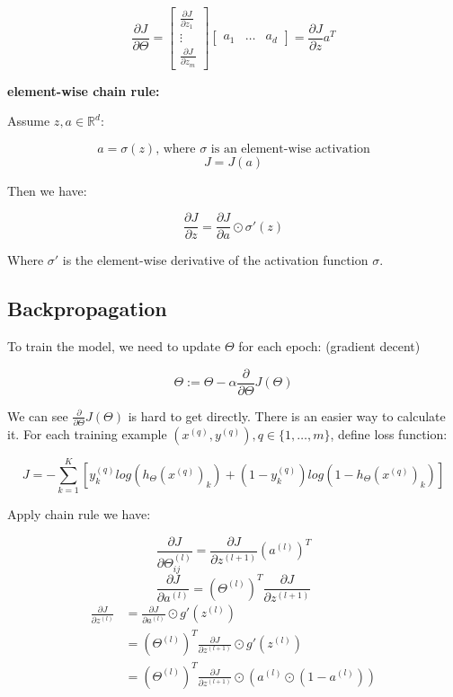 \documentclass{article}
\begin{document}
\[
\frac{\partial J}{\partial \Theta} = 
\begin{bmatrix}
\frac{\partial J}{\partial z_1}\\
\vdots\\
\frac{\partial J}{\partial z_m}
\end{bmatrix}
\begin{bmatrix}
a_1 & \dots & a_d
\end{bmatrix}
= \frac{\partial J}{\partial z} a^T
\]

\noindent \textbf{element-wise chain rule:}

\noindent Assume \(z, a \in \mathbb{R}^d\):

\[a = \sigma(z) \text{, where \(\sigma\) is an element-wise activation}\]
\[J = J(a)\]

\noindent Then we have:

\[\frac{\partial J}{\partial z} = \frac{\partial J}{\partial a} \odot \sigma'(z)\]

\noindent Where \(\sigma'\) is the element-wise derivative of the activation function \(\sigma\).

\subsection{Backpropagation}

\noindent To train the model, we need to update \(\Theta\) for each epoch: (gradient decent)

\[\Theta := \Theta - \alpha  \frac{\partial}{\partial \Theta} J(\Theta)\]

\noindent We can see \(\frac{\partial}{\partial \Theta} J(\Theta)\) is hard to get directly. There is an easier way to calculate it. For each training example \((x^{(q)}, y^{(q)}), q \in \{1, \dots, m\}\), define loss function:

\[J = -\sum_{k = 1}^{K} [y^{(q)}_k log(h_{\Theta} (x^{(q)})_k) + (1 - y^{(q)}_k) log(1 - h_{\Theta}(x^{(q)})_k)] \]

\noindent Apply chain rule we have:

\[\frac{\partial J}{\partial \Theta_{ij}^{(l)}} = \frac{\partial J}{\partial z^{(l + 1)}} (a^{(l)})^T\]
\[\frac{\partial J}{\partial a^{(l)}} = (\Theta^{(l)})^T \frac{\partial J}{\partial z^{(l + 1)}}\]
\begin{equation*}
\begin{split}
\frac{\partial J}{\partial z^{(l)}}
& = \frac{\partial J}{\partial a^{(l)}} \odot g'(z^{(l)}) \\
& = (\Theta^{(l)})^T \frac{\partial J}{\partial z^{(l + 1)}} \odot g'(z^{(l)}) \\
& = (\Theta^{(l)})^T \frac{\partial J}{\partial z^{(l + 1)}} \odot (a^{(l)} \odot (1 - a^{(l)}))
\end{split}
\end{equation*}
\end{document}
